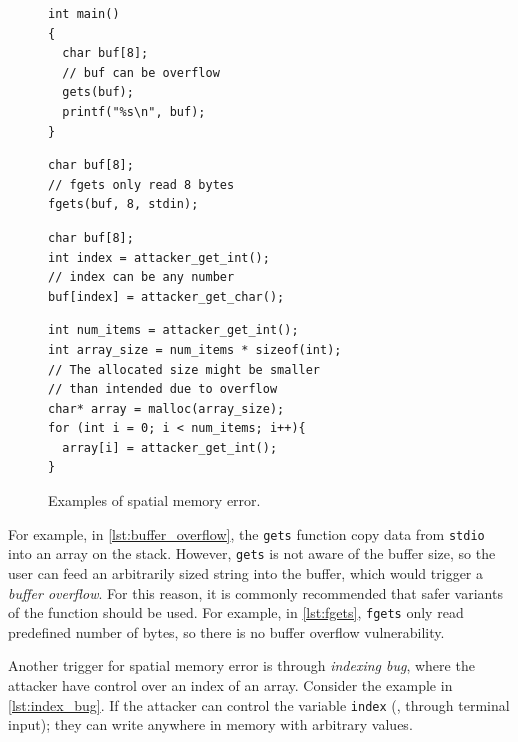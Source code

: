 \documentclass[11pt]{memoir}
\begin{document}
\begin{figure}[t]
\begin{minipage}[t]{.4\textwidth}
\begin{verbatim}
int main()
{
  char buf[8];
  // buf can be overflow
  gets(buf); 
  printf("%s\n", buf);
}
\end{verbatim}
\label{lst:buffer_overflow}
\begin{verbatim}
char buf[8];
// fgets only read 8 bytes
fgets(buf, 8, stdin); 
\end{verbatim}
\label{lst:fgets}
\end{minipage}%
\hfill\begin{minipage}[t]{.54\textwidth}
\begin{verbatim}
char buf[8];
int index = attacker_get_int();
// index can be any number
buf[index] = attacker_get_char();
\end{verbatim}
\label{lst:index_bug}
\begin{verbatim}
int num_items = attacker_get_int();
int array_size = num_items * sizeof(int);
// The allocated size might be smaller 
// than intended due to overflow
char* array = malloc(array_size);
for (int i = 0; i < num_items; i++){
  array[i] = attacker_get_int();
}
\end{verbatim}
\label{lst:integer_overflow}
\end{minipage}
\caption{Examples of spatial memory error.}
\end{figure}



For example, in \cref{lst:buffer_overflow}, the \texttt{gets} function copy
data from \texttt{stdio} into an array on the stack.
However, \texttt{gets} is not aware of the buffer size, so the user can feed an
arbitrarily sized string into the buffer, which would trigger a \emph{buffer
overflow}.
For this reason, it is commonly recommended that safer variants of the function should be used. 
For example, in \cref{lst:fgets}, \texttt{fgets} only read predefined number of
bytes, so there is no buffer overflow vulnerability.





Another trigger for spatial memory error is through \emph{indexing bug}, where
the attacker have control over an index of an array.
Consider the example in \cref{lst:index_bug}. 
If the attacker can control the variable \texttt{index} (\eg, through terminal
input); they can write anywhere in memory with arbitrary values.
\end{document}
